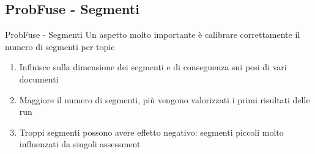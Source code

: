 \subsection{ProbFuse - Segmenti}
\begin{frame}{ProbFuse - Segmenti}
	Un aspetto molto importante è calibrare correttamente il numero di segmenti per topic\\
	\bigskip
	\begin{enumerate}
		\item Influisce sulla dimensione dei segmenti e di conseguenza sui pesi di vari documenti
		\item Maggiore il numero di segmenti, più vengono valorizzati i primi risultati delle run
		\item Troppi segmenti possono avere effetto negativo: segmenti piccoli molto influenzati da singoli assessment
	\end{enumerate}
\end{frame}